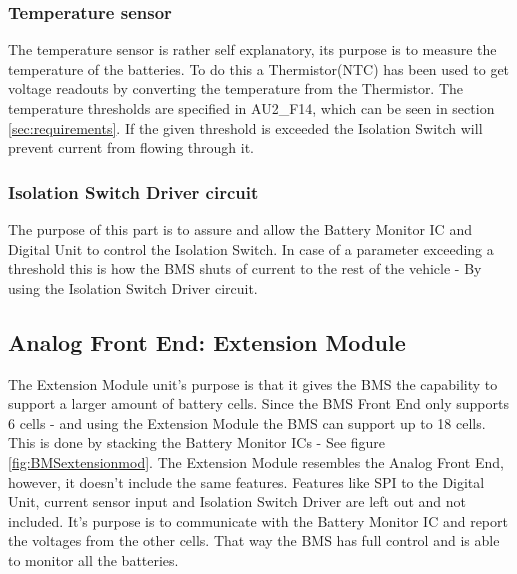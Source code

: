 \subsubsection{Temperature sensor}
The temperature sensor is rather self explanatory, its purpose is to measure the temperature of the batteries. To do this a Thermistor(NTC) has been used to get voltage readouts by converting the temperature from the Thermistor. The temperature thresholds are specified in AU2\_F14, which can be seen in section \vref{sec:requirements}. If the given threshold is exceeded the Isolation Switch will prevent current from flowing through it.

\subsubsection{Isolation Switch Driver circuit}
The purpose of this part is to assure and allow the Battery Monitor IC and Digital Unit to control the Isolation Switch. In case of a parameter exceeding a threshold this is how the BMS shuts of current to the rest of the vehicle - By using the Isolation Switch Driver circuit.

\subsection{Analog Front End: Extension Module}
The Extension Module unit's purpose is that it gives the BMS the capability to support a larger amount of battery cells. Since the BMS Front End only supports 6 cells - and using the Extension Module the BMS can support up to 18 cells. This is done by stacking the Battery Monitor ICs - See figure \vref{fig:BMSextensionmod}. The Extension Module resembles the Analog Front End, however, it doesn't include the same features. Features like SPI to the Digital Unit, current sensor input and Isolation Switch Driver are left out and not included. It's purpose is to communicate with the Battery Monitor IC and report the voltages from the other cells. That way the BMS has full control and is able to monitor all the batteries.\\


